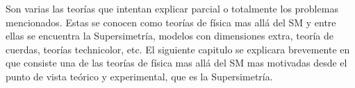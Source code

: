 Son varias las teorías que intentan explicar parcial o totalmente los problemas
mencionados. Estas se conocen como teorías de física mas allá del SM y entre
ellas se encuentra la Supersimetría, modelos con dimensiones extra, teoría de
cuerdas, teorías technicolor, etc. El siguiente capitulo se explicara brevemente
en que consiste una de las teorías de física mas allá del SM mas motivadas desde
el punto de vista teórico y experimental, que es la Supersimetría.


